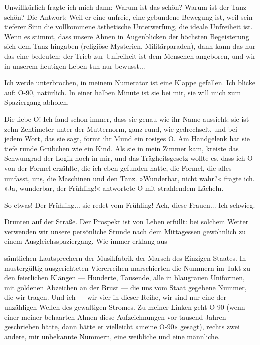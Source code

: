 Unwillkürlich fragte ich mich dann: Warum ist das schön? Warum ist
der Tanz schön? Die Antwort: Weil er eine unfreie, eine gebundene
Bewegung ist, weil sein tieferer Sinn die vollkommene ästhetische
Unterwerfung, die ideale Unfreiheit ist. Wenn es stimmt, dass
unsere Ahnen in Augenblicken der höchsten Begeisterung sich dem
Tanz hingaben (religiöse Mysterien, Militärparaden), dann kann das
nur das eine bedeuten: der Trieb zur Unfreiheit ist dem Menschen
angeboren, und wir in unserem heutigen Leben tun nur bewusst...

Ich werde unterbrochen, in meinem Numerator ist eine Klappe
gefallen. Ich blicke auf: O-90, natürlich. In einer halben Minute
ist sie bei mir, sie will mich zum Spaziergang abholen.

Die liebe O! Ich fand schon immer, dass sie genau wie ihr Name
aussieht: sie ist zehn Zentimeter unter der Mutternorm, ganz rund,
wie gedrechselt, und bei jedem Wort, das sie sagt, formt ihr Mund
ein rosiges O. Am Handgelenk hat sie tiefe runde Grübchen wie ein
Kind. Als sie in mein Zimmer kam, kreiste das Schwungrad der Logik
noch in mir, und das Trägheitsgesetz wollte es, dass ich O von der
Formel erzählte, die ich eben gefunden hatte, die Formel, die alles
umfasst, uns, die Maschinen und den Tanz. »Wunderbar, nicht wahr?«
fragte ich. »Ja, wunderbar, der Frühling!« antwortete O mit
strahlendem Lächeln.

So etwas! Der Frühling... sie redet vom Frühling! Ach, diese
Frauen... Ich schwieg.

Drunten auf der Straße. Der Prospekt ist von Leben erfüllt: bei
solchem Wetter verwenden wir unsere persönliche Stunde nach dem
Mittagessen gewöhnlich zu einem Ausgleichsspaziergang. Wie immer
erklang aus

sämtlichen Lautsprechern der Musikfabrik der Marsch des Einzigen
Staates. In mustergültig ausgerichteten Viererreihen marschierten
die Nummern im Takt zu den feierlichen Klängen — Hunderte,
Tausende, alle in blaugrauen Uniformen, mit goldenen Abzeichen an
der Brust — die uns vom Staat gegebene Nummer, die wir tragen. Und
ich — wir vier in dieser Reihe, wir sind nur eine der unzähligen
Wellen des gewaltigen Stromes. Zu meiner Linken geht O-90 (wenn
einer meiner behaarten Ahnen diese Aufzeichnungen vor tausend
Jahren geschrieben hätte, dann hätte er vielleicht »meine O-90«
gesagt), rechts zwei andere, mir unbekannte Nummern, eine weibliche
und eine männliche.

